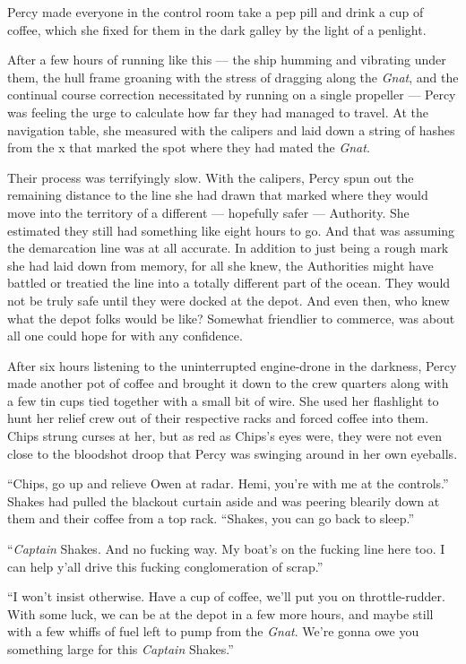 \documentclass[
]{scrbook}
\begin{document}
Percy made everyone in the control room take a pep pill and drink a cup
of coffee, which she fixed for them in the dark galley by the light of a
penlight.

After a few hours of running like this --- the ship humming and
vibrating under them, the hull frame groaning with the stress of
dragging along the \emph{Gnat}, and the continual course correction
necessitated by running on a single propeller --- Percy was feeling the
urge to calculate how far they had managed to travel. At the navigation
table, she measured with the calipers and laid down a string of hashes
from the x that marked the spot where they had mated the \emph{Gnat}.

Their process was terrifyingly slow. With the calipers, Percy spun out
the remaining distance to the line she had drawn that marked where they
would move into the territory of a different --- hopefully safer ---
Authority. She estimated they still had something like eight hours to
go. And that was assuming the demarcation line was at all accurate. In
addition to just being a rough mark she had laid down from memory, for
all she knew, the Authorities might have battled or treatied the line
into a totally different part of the ocean. They would not be truly safe
until they were docked at the depot. And even then, who knew what the
depot folks would be like? Somewhat friendlier to commerce, was about
all one could hope for with any confidence.

After six hours listening to the uninterrupted engine-drone in the
darkness, Percy made another pot of coffee and brought it down to the
crew quarters along with a few tin cups tied together with a small bit
of wire. She used her flashlight to hunt her relief crew out of their
respective racks and forced coffee into them. Chips strung curses at
her, but as red as Chips's eyes were, they were not even close to the
bloodshot droop that Percy was swinging around in her own eyeballs.

``Chips, go up and relieve Owen at radar. Hemi, you're with me at the
controls.'' Shakes had pulled the blackout curtain aside and was peering
blearily down at them and their coffee from a top rack. ``Shakes, you
can go back to sleep.''

``\emph{Captain} Shakes. And no fucking way. My boat's on the fucking
line here too. I can help y'all drive this fucking conglomeration of
scrap.''

``I won't insist otherwise. Have a cup of coffee, we'll put you on
throttle-rudder. With some luck, we can be at the depot in a few more
hours, and maybe still with a few whiffs of fuel left to pump from the
\emph{Gnat}. We're gonna owe you something large for this \emph{Captain}
Shakes.''
\end{document}
